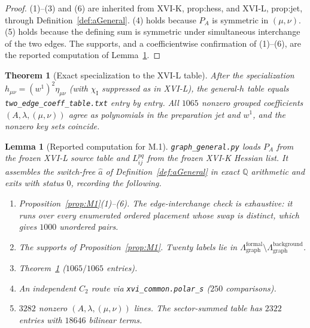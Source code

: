 \documentclass{article}
\newtheorem{theorem}[proposition]{Theorem}
\newtheorem{lemma}[proposition]{Lemma}
\theoremstyle{remark}
\newcommand{\chiI}{\chi_{\mathrm I}}
\begin{document}
\begin{proof}
(1)--(3) and (6) are inherited from XVI-K, prop:hess, and XVI-L, prop:jet, through Definition~\ref{def:aGeneral}.
(4) holds because $P_A$ is symmetric in $(\mu,\nu)$.
(5) holds because the defining sum is symmetric under simultaneous interchange of the two edges.
The supports, and a coefficientwise confirmation of (1)--(6), are the reported computation of Lemma~\ref{lem:M1comp}.
\end{proof}

\begin{theorem}[Exact specialization to the XVI-L table]
\label{thm:M1spec}
After the specialization $h_{\mu\nu}=(w^1)^2\eta_{\mu\nu}$ (with $\chiI$ suppressed as in XVI-L), the general-$h$ table equals \texttt{two\_edge\_coeff\_table.txt} entry by entry.
All $1065$ nonzero grouped coefficients $(A,\lambda,(\mu,\nu))$ agree as polynomials in the preparation jet and $w^1$, and the nonzero key sets coincide.
\end{theorem}

\begin{lemma}[Reported computation for M.1]
\label{lem:M1comp}
\texttt{graph\_general.py} loads $P_A$ from the frozen XVI-L source table and $L^{pq}_{ij}$ from the frozen XVI-K Hessian list.
It assembles the switch-free $\hat a$ of Definition~\ref{def:aGeneral} in exact $\mathbb Q$ arithmetic and exits with status $0$, recording the following.
\begin{enumerate}
\item[(G1)] Proposition~\ref{prop:M1}(1)--(6). The edge-interchange check is \emph{exhaustive}: it runs over every enumerated ordered placement whose swap is distinct, which gives $1000$ unordered pairs.
\item[(G2)] The supports of Proposition~\ref{prop:M1}. Twenty labels lie in $\Lambda^{\mathrm{formal}}_{\mathrm{graph}}\setminus\Lambda^{\mathrm{background}}_{\mathrm{graph}}$.
\item[(G3)] Theorem~\ref{thm:M1spec} ($1065/1065$ entries).
\item[(G4)] An independent $C_2$ route via \texttt{xvi\_common.polar\_s} ($250$ comparisons).
\item[(G5)] $3282$ nonzero $(A,\lambda,(\mu,\nu))$ lines. The sector-summed table has $2322$ entries with $18646$ bilinear terms.
\end{enumerate}
\end{lemma}

\end{document}
